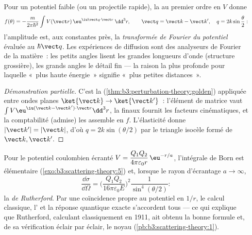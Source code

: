 \begin{theorem}\label{thm:b3:scattering-theory:born}
Pour un potentiel faible (ou un projectile rapide), la  au premier ordre en $V$ donne
\[
f(\theta) = -\frac{m}{2\pi\hbar^2}
\int V(\vect r)\,\eu^{\iu\vect q\cdot\vect r}\,\dd^3r ,
\qquad
\vect q = \vect k - \vect k' , \quad
q = 2k\sin\frac\theta2 :
\]
l'amplitude est, aux constantes près, la \emph{transformée de Fourier
du potentiel} évaluée au  $\hbar\vect q$. Les
expériences de diffusion sont des analyseurs de Fourier de la
matière~: les petits angles lisent les grandes longueurs d'onde
(structure grossière), les grands angles le détail fin --- la raison
la plus profonde pour laquelle «~plus haute énergie~» signifie «~plus
petites distances~».
\end{theorem}

\begin{proof}[Démonstration partielle]
C'est la 
(\cref{thm:b3:perturbation-theory:golden}) appliquée entre ondes
planes $\ket{\vect k} \to \ket{\vect k'}$~: l'élément de matrice vaut
$\int V\eu^{\iu(\vect k - \vect k')\cdot\vect r}\dd^3r$, la  finaux fournit les facteurs cinématiques, et la comptabilité
(admise) les assemble en $f$. L'élasticité donne
$|\vect k'| = |\vect k|$, d'où $q = 2k\sin(\theta/2)$ par le triangle
isocèle formé de $\vect k, \vect k'$.
\end{proof}

\begin{example}\label{ex:b3:scattering-theory:rutherford}
Pour le potentiel coulombien écranté $V = \dfrac{Q_1Q_2}{4\pi
\varepsilon_0 r}\,\eu^{-r/a}$, l'intégrale de Born est élémentaire
(\cref{exo:b3:scattering-theory:5}) et, lorsque le rayon d'écrantage
$a \to \infty$,
\[
\frac{\dd\sigma}{\dd\Omega} =
\Big(\frac{Q_1Q_2}{16\pi\varepsilon_0 E}\Big)^2
\frac{1}{\sin^4(\theta/2)} :
\]
la \emph{ de Rutherford}. Par une coïncidence
propre au potentiel en $1/r$, le calcul classique, l' et la réponse
quantique exacte s'accordent tous --- ce qui explique que Rutherford,
calculant classiquement en 1911, ait obtenu la bonne formule et, de sa
vérification éclair par éclair, le noyau
(\cref{pb:b3:scattering-theory:1}).
\end{example}

